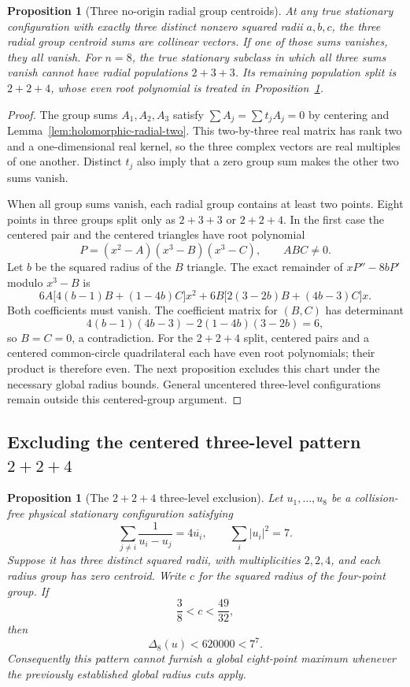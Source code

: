 \documentclass[11pt]{article}
\newtheorem{proposition}[theorem]{Proposition}
\theoremstyle{remark}
\numberwithin{equation}{section}
\begin{document}
\begin{proposition}[Three no-origin radial group centroids]
\label{prop:noorigin-three-centroids}
At any true stationary configuration with exactly three distinct
nonzero squared radii $a,b,c$, the three radial group centroid sums
are collinear vectors. If one of those sums vanishes, they all vanish.
For $n=8$, the true stationary subclass in which all three sums vanish
cannot have radial populations $2+3+3$. Its remaining population split is $2+2+4$, whose even root polynomial
is treated in Proposition~\ref{prop:eight-centered-threelevel-224}.
\end{proposition}
\begin{proof}
The group sums $A_1,A_2,A_3$ satisfy
$\sum A_j=\sum t_jA_j=0$ by centering and
Lemma~\ref{lem:holomorphic-radial-two}. This two-by-three real matrix
has rank two and a one-dimensional real kernel, so the three complex
vectors are real multiples of one another. Distinct $t_j$ also imply
that a zero group sum makes the other two sums vanish.

When all group sums vanish, each radial group contains at least two
points. Eight points in three groups split only as $2+3+3$ or $2+2+4$.
In the first case the centered pair and the centered triangles have
root polynomial
\[
                   P=(x^2-A)(x^3-B)(x^3-C),\qquad ABC\ne0.
\]
Let $b$ be the squared radius of the $B$ triangle. The exact remainder
of $xP''-8bP'$ modulo $x^3-B$ is
\[
 6A\bigl[4(b-1)B+(1-4b)C\bigr]x^2
 +6B\bigl[2(3-2b)B+(4b-3)C\bigr]x.
\]
Both coefficients must vanish. The coefficient matrix for $(B,C)$
has determinant
\[
       4(b-1)(4b-3)-2(1-4b)(3-2b)=6,
\]
so $B=C=0$, a contradiction. For the $2+2+4$ split, centered pairs
and a centered common-circle quadrilateral each have even root
polynomials; their product is therefore even. The next proposition excludes this chart under the necessary global
radius bounds. General uncentered three-level configurations remain
outside this centered-group argument.
\end{proof}

\subsection{Excluding the centered three-level pattern \texorpdfstring{$2+2+4$}{2+2+4}}
\label{sec:eight-centered-threelevel-224}

\begin{proposition}[The $2+2+4$ three-level exclusion]
\label{prop:eight-centered-threelevel-224}
Let $u_1,\ldots,u_8$ be a collision-free physical stationary
configuration satisfying
\[
 \sum_{j\ne i}\frac1{u_i-u_j}=4\overline{u_i},\qquad
 \sum_i|u_i|^2=7.
\]
Suppose it has three distinct squared radii, with multiplicities
$2,2,4$, and each radius group has zero centroid. Write $c$ for the
squared radius of the four-point group. If
\[
                     \frac38<c<\frac{49}{32},
\]
then
\[
             \Delta_8(u)<620000<7^7.
\]
Consequently this pattern cannot furnish a global eight-point maximum
whenever the previously established global radius cuts apply.
\end{proposition}
\end{document}
